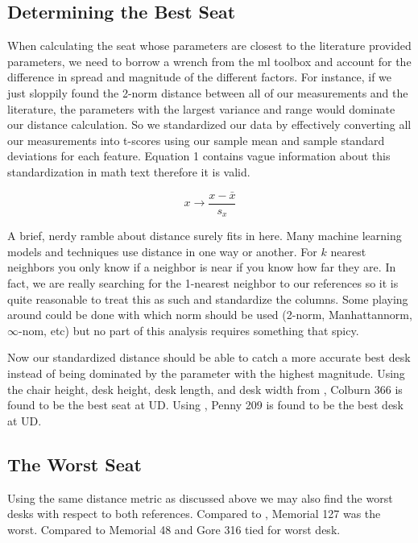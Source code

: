 \documentclass[conference]{IEEEtran}
\begin{document}
\subsection{Determining the Best Seat}
When calculating the seat whose parameters are closest to the literature provided parameters, we need to borrow a wrench from the ml toolbox and account for the difference in spread and magnitude of the different factors. For instance, if we just sloppily found the 2-norm distance between all of our measurements and the literature, the parameters with the largest variance and range would dominate our distance calculation. So we standardized our data by effectively converting all our measurements into t-scores using our sample mean and sample standard deviations for each feature. Equation 1 contains vague information about this standardization in math text therefore it is valid.

\[ x \longrightarrow \frac{x - \bar{x}}{s_x} \label{eqn:standardize} \tag{1} \]

A brief, nerdy ramble about distance surely fits in here. Many machine learning models and techniques use distance in one way or another. For $k$ nearest neighbors you only know if a neighbor is near if you know how far they are. In fact, we are really searching for the 1-nearest neighbor to our references so it is quite reasonable to treat this as such and standardize the columns. Some playing around could be done with which norm should be used (2-norm, Manhattannorm, $\infty$-nom, etc) but no part of this analysis requires something that spicy.

Now our standardized distance should be able to catch a more accurate best desk instead of being dominated by the parameter with the highest magnitude. Using the chair height, desk height, desk length, and desk width from \cite{Ansari}, Colburn 366 is found to be the best seat at UD. Using \cite{mohamed}, Penny 209 is found to be the best desk at UD. 

\subsection{The Worst Seat}

Using the same distance metric as discussed above we may also find the worst desks with respect to both references. Compared to \cite{Ansari}, Memorial 127 was the worst. Compared to \cite{mohamed} Memorial 48 and Gore 316 tied for worst desk.
\end{document}
